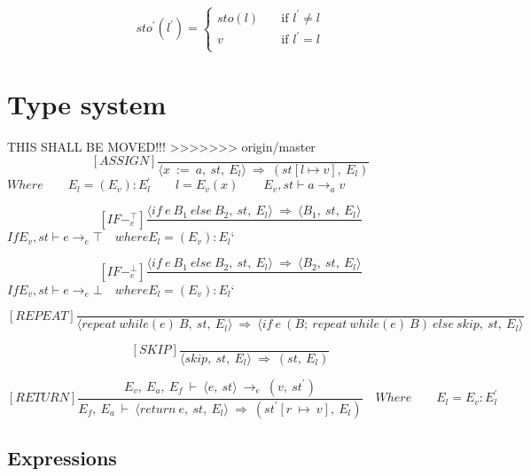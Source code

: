   \[ sto^{'}(l^{'}) =
    \begin{cases}
      sto(l)       & \quad \text{if } l^{'} \not= l\\
      v  & \quad \text{if } l^{'} = l\\
    \end{cases}
  \]
  
  
  
  
  \section{Type system}
  THIS SHALL BE MOVED!!!
>>>>>>> origin/master
	\[
	[ASSIGN]
	\dfrac{}{\langle x \ := \ a, \ st, \ E_l \rangle \ \Rightarrow \ (st[l \mapsto v], \ E_l)}
	\]
	\begin{math}
		Where
		\qquad E_l = (E_v) : E_l^{‘}
		\qquad l = E_v(x)
		\qquad E_v, st \vdash a \rightarrow_a v
	\end{math}
	
	\[
	[IF-^{\top}_e]
	\dfrac{\langle if \ e \ B_1 \ else \ B_2, \ st, \ E_l \rangle \ \Rightarrow \ \langle B_1, \ st, \ E_l \rangle}{}
	\]
	\begin{math}
		If E_v, st \vdash e \rightarrow_e \top \quad where E_l = (E_v) : E_l{‘}
	\end{math}
	
	\[
	[IF-^{\bot}_e]
	\dfrac{\langle if \ e \ B_1 \ else \ B_2, \ st, \ E_l \rangle \ \Rightarrow \ \langle B_2, \ st, \ E_l \rangle}{}
	\]
	\begin{math}
		If E_v, st \vdash e \rightarrow_e \bot \quad where E_l = (E_v) : E_l{‘}
	\end{math}
	
	\[
	[REPEAT]
	\dfrac{}{\langle repeat \ while(e) \ B, \ st, \ E_l \rangle \ \Rightarrow \ \langle if \ e \ (B; \ repeat \ while(e) \ B) \ else \ skip, \ st, \ E_l \rangle}
	\]
	
	\[
	[SKIP]
	\dfrac{}{\langle skip, \ st, \ E_l \rangle \ \Rightarrow \ (st, \ E_l)}
	\]
	
	\[
	[RETURN]	
	\dfrac{E_v, \ E_a, \ E_f \ \vdash \ \langle e, \ st \rangle \ \rightarrow_e \ (v, \ st^{'})}{E_f, \ E_a \ \vdash \ \langle return \ e, \ st, \ E_l \rangle \ \Rightarrow \ (st^{'}[r \ \mapsto \ v], \ E_l)}
	\quad Where	
	\qquad E_l = E_v : E_l^{'}	
	\]
	
	
	
	
	
	\subsection{Expressions}
	
